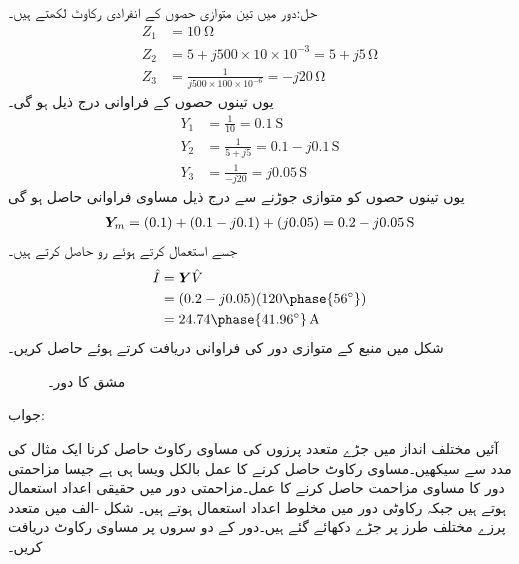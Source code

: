 حل:دور میں تین متوازی حصوں کے انفرادی رکاوٹ لکھتے  ہیں۔
\begin{align*}
Z_1&=\SI{10}{\ohm}\\
Z_2&=5+j 500\times 10\times 10^{-3}=5+j5 \, \si{\ohm}\\
Z_3&=\frac{1}{j 500 \times 100 \times 10^{-6}}=-j20 \, \si{\ohm}
\end{align*}
یوں تینوں حصوں کے فراوانی درج ذیل ہو گی۔
\begin{align*}
Y_1&=\frac{1}{10}=\SI{0.1}{\siemens}\\
Y_2&=\frac{1}{5+j5}=0.1-j0.1 \, \si{\siemens}\\
Y_3&=\frac{1}{-j20}=j0.05 \, \si{\siemens}
\end{align*}
یوں تینوں حصوں کو متوازی جوڑنے سے درج ذیل مساوی فراوانی حاصل ہو گی
\begin{align*}
\bY_m=(0.1)+(0.1-j0.1)+(j0.05)=0.2-j0.05 \, \si{\siemens}
\end{align*}
جسے استعمال کرتے ہوئے رو حاصل کرتے ہیں۔
\begin{align*}
\hat{I}&=\bY \hat{V}\\
&=(0.2-j0.05) (120 \phase{56^{\circ}})\\
&=24.74\phase{41.96^{\circ}} \, \si{\ampere}
\end{align*} 
شکل  میں منبع کے متوازی دور کی فراوانی دریافت کرتے ہوئے  حاصل کریں۔
\begin{figure}
\centering
{}
\caption{مشق  کا دور۔}
\label{شکل_بدلتا_متوازی_پ}
\end{figure}

جواب:

آئیں مختلف انداز میں جڑے متعدد پرزوں کی مساوی رکاوٹ حاصل کرنا ایک مثال کی مدد سے سیکھیں۔مساوی رکاوٹ حاصل کرنے کا عمل بالکل ویسا ہی ہے جیسا مزاحمتی دور کا مساوی مزاحمت حاصل کرنے کا عمل۔مزاحمتی دور میں حقیقی اعداد استعمال ہوتے ہیں جبکہ رکاوٹی دور میں مخلوط اعداد استعمال ہوتے ہیں۔
شکل -الف میں متعدد پرزے مختلف طرز پر جڑے دکھائے گئے ہیں۔دور کے دو سروں پر مساوی رکاوٹ  دریافت کریں۔

